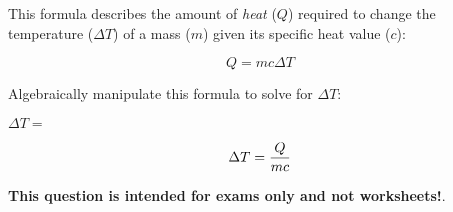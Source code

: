 

This formula describes the amount of {\it heat} ($Q$) required to change the temperature ($\Delta T$) of a mass ($m$) given its specific heat value ($c$):

$$Q = mc \Delta T$$

Algebraically manipulate this formula to solve for $\Delta T$:

\vskip 20pt

$\Delta T = $







$$\Delta T = {Q \over {m c}}$$







{\bf This question is intended for exams only and not worksheets!}.



